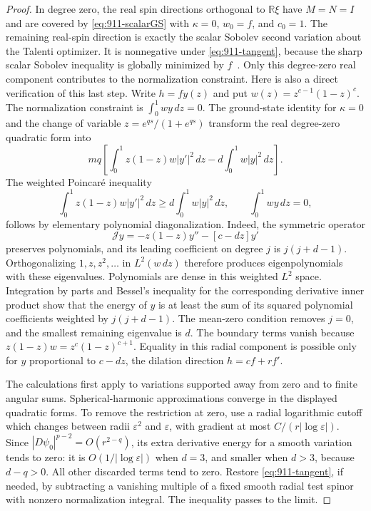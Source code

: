 \documentclass[11pt,a4paper]{article}
\theoremstyle{remark}
\begin{document}
\begin{proof}
In degree zero, the real spin directions orthogonal to $\mathbb R\xi$
have $M=N=I$ and are covered by \eqref{eq:911-scalarGS} with
$\kappa=0$, $w_0=f$, and $c_0=1$. The remaining real-spin direction is
exactly the scalar Sobolev second variation about the Talenti optimizer.
It is nonnegative under \eqref{eq:911-tangent}, because the sharp scalar
Sobolev inequality is globally minimized by $f$~\cite{Talenti1976}. Only
this degree-zero real component contributes to the normalization
constraint. Here is also a direct verification of this last step.
Write $h=f y(z)$ and put $w(z)=z^{c-1}(1-z)^c$. The normalization
constraint is $\int_0^1 wy\,dz=0$. The ground-state identity for
$\kappa=0$ and the change of variable $z=e^{qs}/(1+e^{qs})$ transform
the real degree-zero quadratic form into
\[
 m q\left[\int_0^1 z(1-z)w|y'|^2\,dz
             -d\int_0^1 w|y|^2\,dz\right].
\]
The weighted Poincar\'e inequality
\[
 \int_0^1 z(1-z)w|y'|^2\,dz
 \ge d\int_0^1 w|y|^2\,dz,
 \qquad \int_0^1 wy\,dz=0,
\]
follows by elementary polynomial diagonalization. Indeed, the symmetric
operator
\[
 \mathcal J y=-z(1-z)y''-[c-dz]y'
\]
preserves polynomials, and its leading coefficient on degree $j$ is
$j(j+d-1)$. Orthogonalizing $1,z,z^2,\ldots$ in $L^2(w\,dz)$ therefore
produces eigenpolynomials with these eigenvalues. Polynomials are dense
in this weighted $L^2$ space. Integration by parts and Bessel's
inequality for the corresponding derivative inner product show that
the energy of $y$ is at least the sum of its squared polynomial
coefficients weighted by $j(j+d-1)$. The mean-zero condition removes
$j=0$, and the smallest remaining eigenvalue is $d$. The boundary
terms vanish because $z(1-z)w=z^c(1-z)^{c+1}$. Equality in this radial
component is possible only for $y$ proportional to $c-dz$, the dilation
direction $h=cf+rf'$.

The calculations first apply to variations supported away from zero and
to finite angular sums. Spherical-harmonic approximations converge in the
displayed quadratic forms. To remove the restriction at zero, use a
radial logarithmic cutoff which changes between radii $\varepsilon^2$
and $\varepsilon$, with gradient at most
$C/(r|\log\varepsilon|)$. Since
$|D\psi_0|^{p-2}=O(r^{2-q})$, its extra derivative energy for a smooth
variation tends to zero: it is $O(1/|\log\varepsilon|)$ when $d=3$, and
smaller when $d>3$, because $d-q>0$. All other discarded terms tend to
zero. Restore \eqref{eq:911-tangent}, if needed, by subtracting a vanishing
multiple of a fixed smooth radial test spinor with nonzero normalization
integral. The inequality passes to the limit.
\end{proof}
\end{document}
